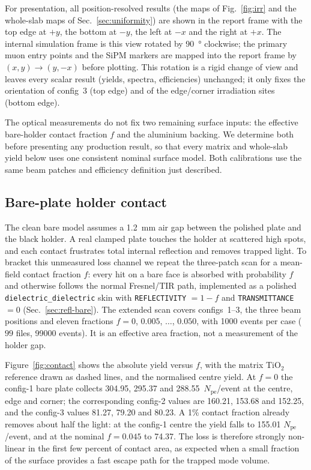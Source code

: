 \documentclass[11pt,a4paper]{article}
\newcommand{\pe}{\ensuremath{N_{\mathrm{pe}}}}
\begin{document}
For presentation, all position-resolved results (the maps of
Fig.~\ref{fig:irr} and the whole-slab maps
of Sec.~\ref{sec:uniformity}) are shown in the report frame with the top edge at $+y$,
the bottom at $-y$, the left at $-x$ and the right at $+x$. The internal
simulation frame is this view rotated by \SI{90}{\degree} clockwise; the primary
muon entry points and the SiPM markers are mapped into the report frame by
$(x,y)\to(y,-x)$ before plotting. This rotation is a rigid change of view and
leaves every scalar result (yields, spectra, efficiencies) unchanged; it only
fixes the orientation of config~3 (top edge) and of the edge/corner irradiation
sites (bottom edge).

The optical measurements do not fix two remaining surface inputs: the effective
bare-holder contact fraction $f$ and the aluminium backing. We determine both
before presenting any production result, so that every matrix and whole-slab
yield below uses one consistent nominal surface model. Both calibrations use the
same beam patches and efficiency definition just described.

\subsection{Bare-plate holder contact}
\label{sec:contact}

The clean bare model assumes a \SI{1.2}{\milli\meter} air gap between the
polished plate and the black holder. A real clamped plate touches the holder at
scattered high spots, and each contact frustrates total internal reflection and
removes trapped light. To bracket this unmeasured loss channel we repeat the
three-patch scan for a mean-field contact fraction $f$: every hit on a bare face
is absorbed with probability $f$ and otherwise follows the normal Fresnel/TIR
path, implemented as a polished \texttt{dielectric\_dielectric} skin with
\texttt{REFLECTIVITY} $=1-f$ and \texttt{TRANSMITTANCE} $=0$
(Sec.~\ref{sec:refl-bare}). The extended scan covers configs~1--3, the three beam
positions and eleven fractions $f=0$, $0.005$, $\dots$, $0.050$, with \num{1000}
events per case ($99$ files, \num{99000} events). It is an effective area
fraction, not a measurement of the holder gap.

Figure~\ref{fig:contact} shows the absolute yield versus $f$, with the matrix
TiO$_2$ reference drawn as dashed lines, and the normalised centre yield.
At $f=0$ the config-1 bare plate collects \num{304.95}, \num{295.37} and
\num{288.55}~\pe/event at the centre, edge and corner; the corresponding config-2
values are \num{160.21}, \num{153.68} and \num{152.25}, and the config-3 values
\num{81.27}, \num{79.20} and \num{80.23}. A 1\% contact fraction already removes
about half the light: at the config-1 centre the yield falls to \num{155.01}
\pe/event, and at the nominal $f=\num{0.045}$ to \num{74.37}. The loss is therefore
strongly non-linear in the first few percent of contact area, as expected when a
small fraction of the surface provides a fast escape path for the trapped mode
volume.
\end{document}
